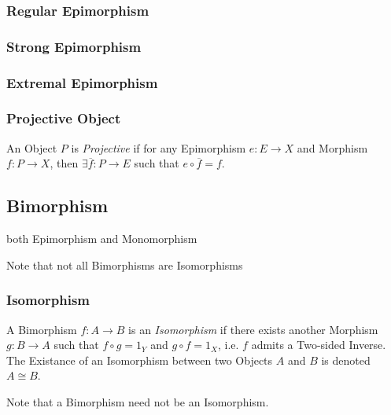 \subsubsection{Regular Epimorphism}\label{sec:regular_epimorphism}

\subsubsection{Strong Epimorphism}\label{sec:strong_epimorphism}

\subsubsection{Extremal Epimorphism}\label{sec:extremal_epimorphism}

\subsubsection{Projective Object}\label{sec:projective_object}

An Object $P$ is \emph{Projective} if for any Epimorphism $e : E
\rightarrow X$ and Morphism $f : P \rightarrow X$, then $\exists
\overline{f} : P \rightarrow E$ such that $e \circ \overline{f} = f$.



\subsection{Bimorphism}\label{sec:bimorphism}

both Epimorphism and Monomorphism

\fist Note that not all Bimorphisms are Isomorphisms



\subsubsection{Isomorphism}\label{sec:isomorphism}

A Bimorphism $f : A \rightarrow B$ is an \emph{Isomorphism} if there
exists another Morphism $g : B \rightarrow A$ such that $f \circ g =
1_Y$ and $g \circ f = 1_X$, i.e. $f$ admits a Two-sided Inverse. The
Existance of an Isomorphism between two Objects $A$ and $B$ is denoted
$A \cong B$.

\fist Note that a Bimorphism need not be an Isomorphism.


